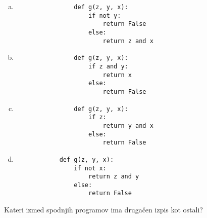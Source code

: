 \documentclass[arhiv, 10pt]{../izpit}
\begin{document}
        \begin{multicols}{2}
        \begin{enumerate}[(a)]
\item 
                \begin{verbatim}
                def g(z, y, x):
                    if not y:
                        return False
                    else:
                        return z and x
                \end{verbatim}
            
\item 
                \begin{verbatim}
                def g(z, y, x):
                    if z and y:
                        return x
                    else:
                        return False
                \end{verbatim}
            
\item 
                \begin{verbatim}
                def g(z, y, x):
                    if z:
                        return y and x
                    else:
                        return False
                \end{verbatim}
            
\item 
            \begin{verbatim}
            def g(z, y, x):
                if not x:
                    return z and y
                else:
                    return False
            \end{verbatim}
        
\end{enumerate}

        \end{multicols}
    
        \naloga*
        
        Kateri izmed spodnjih programov ima drugačen izpis kot ostali?
    
\end{document}
